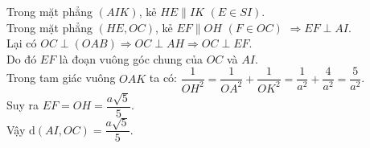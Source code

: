 \begin{bt}
{\begin{enumerate}
			Trong mặt phẳng $(AIK)$, kẻ $HE \parallel IK$ $(E \in SI)$.\\
			Trong mặt phẳng $(HE, OC)$, kẻ $EF \parallel OH$ $(F \in OC)$ $\Rightarrow EF \perp AI$.\\
			Lại có $OC \perp (OAB) \Rightarrow OC \perp AH \Rightarrow OC \perp EF$.\\
			Do đó $EF$ là đoạn vuông góc chung của $OC$ và $AI$.\\
			Trong tam giác vuông $OAK$ ta có: $\dfrac{1}{OH^2} = \dfrac{1}{OA^2} + \dfrac{1}{OK^2} = \dfrac{1}{a^2} + \dfrac{4}{a^2} = \dfrac{5}{a^2}$.\\
			Suy ra $EF = OH = \dfrac{a\sqrt{5}}{5}$.\\
			Vậy $\mathrm{d}(AI, OC) = \dfrac{a\sqrt{5}}{5}$.
		\end{enumerate}
	}
\end{bt}

